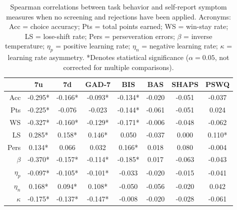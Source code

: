 \documentclass[a4paper,notitlepage,12pt]{article}
\begin{document}
\begin{refsection}[supp]
\begin{table}[H]
\centering
\small
\begin{tabular}{rccccccc}
\toprule
{} &       7u &       7d &    GAD-7 &      BIS &     BAS &   SHAPS &    PSWQ \\
\midrule
Acc      &  -0.295* &  -0.166* &  -0.093* &  -0.134* &  -0.020 &  -0.051 &  -0.037 \\
Pts      &  -0.225* &   -0.076 &   -0.023 &  -0.144* &  -0.061 &  -0.051 &   0.024 \\
WS       &  -0.327* &  -0.160* &  -0.129* &  -0.171* &  -0.006 &  -0.048 &  -0.062 \\
LS       &   0.285* &   0.158* &   0.146* &    0.050 &  -0.037 &   0.000 &  0.110* \\
Pers     &   0.134* &    0.066 &    0.032 &   0.166* &   0.018 &   0.080 &  -0.004 \\
$\beta$  &  -0.370* &  -0.157* &  -0.114* &  -0.185* &   0.017 &  -0.063 &  -0.043 \\
$\eta_p$ &  -0.097* &  -0.105* &  -0.101* &   -0.033 &  -0.020 &  -0.015 &  -0.041 \\
$\eta_n$ &   0.168* &   0.094* &   0.108* &   -0.050 &  -0.056 &  -0.020 &   0.042 \\
$\kappa$ &  -0.175* &  -0.137* &  -0.147* &   -0.008 &  -0.020 &  -0.028 &  -0.061 \\
\bottomrule
\end{tabular}
\captionsetup{width=0.88\textwidth}
\caption{Spearman correlations between task behavior and self-report symptom measures when no screening and rejections have been applied. Acronyms: Acc = choice accuracy; Pts = total points earned; WS = win-stay rate; LS = lose-shift rate; Pers = perseveration errors; $\beta$ = inverse temperature; $\eta_p$ = positive learning rate; $\eta_n$ = negative learning rate; $\kappa$ = learning rate asymmetry. *Denotes statistical significance ($\alpha=0.05$, not corrected for multiple comparisons).}
\end{table}


\end{refsection}
\end{document}
